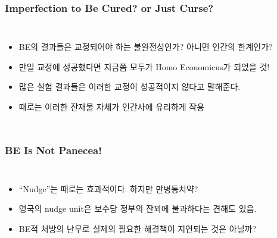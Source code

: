 \documentclass[final]{beamer}
\begin{document}
%
\begin{frame}\frametitle{Imperfection to Be Cured? or Just Curse?}\vspace{2em}
\begin{columns}[c]
\column{18em}
\begin{itemize}
	\item BE의 결과들은 교정되어야 하는 불완전성인가? 아니면 인간의 한계인가?   
	\item 만일 교정에 성공했다면 지금쯤 모두가 Homo Economicus가 되었을 것!
	\item 많은 실험 결과들은 이러한 교정이 성공적이지 않다고 말해준다. 
	\item 때로는 이러한 잔재물 자체가 인간사에 유리하게 작용 
\end{itemize}
\column{12em}
\hspace{-1em}
\end{columns}
%
\end{frame}
%
\begin{frame}\frametitle{BE Is Not Panecea!}\vspace{3.5em}
\begin{columns}[c]
\column{17em}
\begin{itemize}
	\item ``Nudge''는 때로는 효과적이다. 하지만 만병통치약?
	\item 영국의 nudge unit은 보수당 정부의 잔꾀에 불과하다는 견해도 있음. 
	\item BE적 처방의 난무로 실제의 필요한 해결책이 지연되는 것은 아닐까?\\
\end{itemize}
\column{13em}
\hspace{0em}
\end{columns}
\end{frame}
\end{document}
